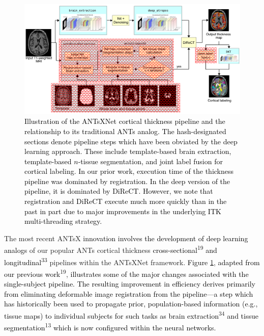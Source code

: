 \documentclass[12pt,]{article}
\begin{document}
\begin{figure}[htb]
  \centering
    \includegraphics[width=\textwidth]{Figures/antsxnetPipeline.pdf}
  \caption{\textcolor{black}{Illustration of the ANTsXNet cortical thickness pipeline and the
  relationship to its traditional ANTs analog.  The hash-designated sections
  denote pipeline steps which have been obviated by the deep learning approach.
  These include template-based brain extraction, template-based $n$-tissue
  segmentation, and joint label fusion for cortical labeling.  In our prior work, execution time of the thickness pipeline was dominated by registration.  In the deep version of the pipeline,
it is dominated by DiReCT.  However, we note that  registration and DiReCT execute much more quickly than in the past in part due to major improvements in the underlying ITK multi-threading strategy.}}
  \label{fig:pipeline}
\end{figure}

The most recent ANTsX
\textcolor{black}{innovation involves the development of
deep learning analogs} of our popular ANTs cortical thickness
\textcolor{black}{cross-sectional}\textsuperscript{19}
\textcolor{black}{and
longitudinal}\textsuperscript{33} pipeline\textcolor{black}{s} within
the ANTsXNet framework. \textcolor{black}{Figure} \ref{fig:pipeline},
\textcolor{black}{adapted from our previous work}\textsuperscript{19},
\textcolor{black}{illustrates some of the major changes associated with the
single-subject pipeline.  The resulting improvement in efficiency
derives primarily from eliminating deformable image registration from the
pipeline---a step which has historically been used to propagate prior,
population-based information (e.g., tissue maps) to individual subjects for such
tasks as brain extraction}\textsuperscript{34}
\textcolor{black}{and tissue
segmentation}\textsuperscript{13}
\textcolor{black}{which is now configured within
the neural networks.}
\end{document}
